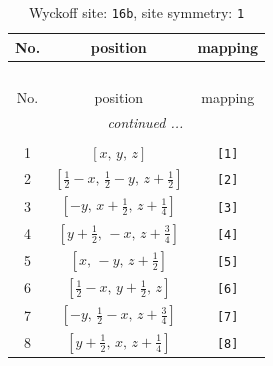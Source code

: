 \documentclass[fleqn,8pt]{jsarticle}
\begin{document}
\begin{longtable}{ccc}
\caption{Wyckoff site: {\tt 16b}, site symmetry: {\tt 1}}
 \\
 \hline \hline
No. & position & mapping \\ \hline \endfirsthead

\multicolumn{2}{l}{\tablename\ \thetable{}} \\
 \hline \hline
No. & position & mapping \\ \hline \endhead

 \hline \hline
\multicolumn{2}{r}{\footnotesize\it continued ...} \\ \endfoot

 \hline \hline
\multicolumn{2}{r}{} \\ \endlastfoot

1 & $\left[ x,\, y,\, z \right]$ & {\tt [1]} \\ \hline
2 & $\left[ \frac{1}{2} - x,\, \frac{1}{2} - y,\, z + \frac{1}{2} \right]$ & {\tt [2]} \\ \hline
3 & $\left[ - y,\, x + \frac{1}{2},\, z + \frac{1}{4} \right]$ & {\tt [3]} \\ \hline
4 & $\left[ y + \frac{1}{2},\, - x,\, z + \frac{3}{4} \right]$ & {\tt [4]} \\ \hline
5 & $\left[ x,\, - y,\, z + \frac{1}{2} \right]$ & {\tt [5]} \\ \hline
6 & $\left[ \frac{1}{2} - x,\, y + \frac{1}{2},\, z \right]$ & {\tt [6]} \\ \hline
7 & $\left[ - y,\, \frac{1}{2} - x,\, z + \frac{3}{4} \right]$ & {\tt [7]} \\ \hline
8 & $\left[ y + \frac{1}{2},\, x,\, z + \frac{1}{4} \right]$ & {\tt [8]} \\
\end{longtable}
\end{document}
